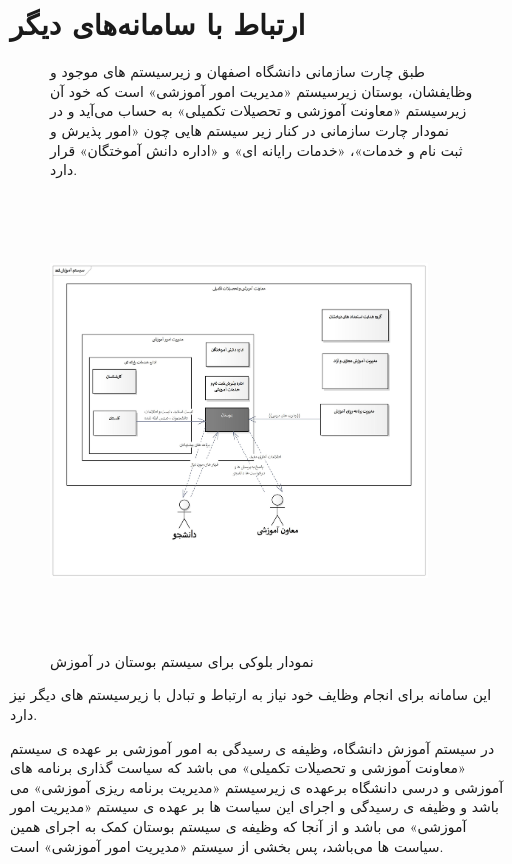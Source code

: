 \documentclass[oneside]{book}
\begin{document}
  
\newpage
\section{ارتباط با سامانه‌های دیگر}

\begin{figure}[h!]
	
	
طبق چارت سازمانی دانشگاه اصفهان و زیرسیستم های موجود و وظایفشان، بوستان زیرسیستم «مدیریت امور آموزشی» است که خود آن  زیرسیستم «معاونت آموزشی و تحصیلات تکمیلی» به حساب می‌آید و در نمودار چارت سازمانی در کنار زیر سیستم هایی چون «امور پذیرش و ثبت نام و خدمات»، «خدمات رایانه ای» و «اداره دانش آموختگان» قرار دارد.

	
\begin{center}
\includegraphics[height = 12cm,width= 10cm]{Education system.jpg}	\begin{center}
\caption{نمودار بلوکی برای سیستم بوستان در آموزش}
\end{center}
		
\end{center}
\end{figure}
 
\newpage
 
 این سامانه برای انجام وظایف خود نیاز به ارتباط و تبادل با زیرسیستم های دیگر نیز دارد.
 
 در سیستم آموزش دانشگاه، وظیفه ی رسیدگی به امور آموزشی بر عهده ی سیستم «معاونت آموزشی و تحصیلات تکمیلی» می باشد که سیاست گذاری برنامه های آموزشی و درسی دانشگاه برعهده ی زیرسیستم «مدیریت برنامه ریزی آموزشی» می باشد و وظیفه ی رسیدگی و اجرای این سیاست ها بر عهده ی سیستم «مدیریت امور آموزشی» می باشد و از آنجا که وظیفه ی سیستم بوستان کمک به اجرای همین سیاست ها می‌باشد، پس بخشی از سیستم «مدیریت امور آموزشی» است.
 
\end{document}
